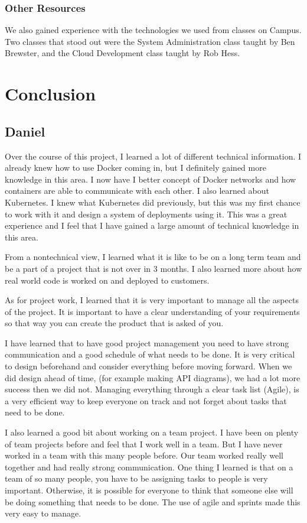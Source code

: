 \documentclass[onecolumn, draftclsnofoot,10pt, compsoc]{IEEEtran}
\begin{document}
\subsubsection{Other Resources}
We also gained experience with the technologies we used from classes on Campus. Two classes that stood out were the System Administration class taught by Ben Brewster, and the Cloud Development class taught by Rob Hess.

\section{Conclusion}
\subsection{Daniel}
Over the course of this project, I learned a lot of different technical information. I already knew how to use Docker coming in, but I definitely gained more knowledge in this area. I now have I better concept of Docker networks and how containers are able to communicate with each other. I also learned about Kubernetes. I knew what Kubernetes did previously, but this was my first chance to work with it and design a system of deployments using it. This was a great experience and I feel that I have gained a large amount of technical knowledge in this area. 

From a nontechnical view, I learned what it is like to be on a long term team and be a part of a project that is not over in 3 months. I also learned more about how real world code is worked on and deployed to customers. 

As for project work, I learned that it is very important to manage all the aspects of the project. It is important to have a clear understanding of your requirements so that way you can create the product that is asked of you.

I have learned that to have good project management you need to have strong communication and a good schedule of what needs to be done. It is very critical to design beforehand and consider everything before moving forward. When we did design ahead of time, (for example making API diagrams), we had a lot more success then we did not. Managing everything through a clear task list (Agile), is a very efficient way to keep everyone on track and not forget about tasks that need to be done. 

I also learned a good bit about working on a team project. I have been on plenty of team projects before and feel that I work well in a team. But I have never worked in a team with this many people before. Our team worked really well together and had really strong communication. One thing I learned is that on a team of so many people, you have to be assigning tasks to people is very important. Otherwise, it is possible for everyone to think that someone else will be doing something that needs to be done. The use of agile and sprints made this very easy to manage.
\end{document}
